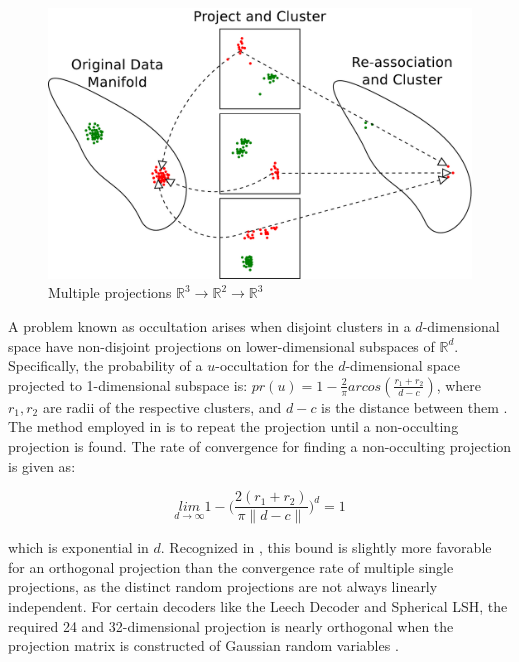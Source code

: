 \begin{figure}
    \centerline{\includegraphics[width=.8\textwidth]{figs/LowToHigh}}
    \caption{Multiple projections $\mathbb{R}^{3}\rightarrow \mathbb{R}^2 \rightarrow \mathbb{R}^3$}\label{lowtohigh}
\end{figure}

A problem known as occultation arises when disjoint clusters in a $d$-dimensional space have non-disjoint projections on
lower-dimensional subspaces of $\mathbb{R}^d$.  Specifically, the probability of a $u$-occultation for the
$d$-dimensional space projected to 1-dimensional subspace is: $pr(u) = 1-{\frac{2}{\pi}} arcos({\frac{r_1+r_2}{d-c}})$,
where $r_1, r_2$ are radii of the respective clusters, and $d-c$ is the distance between them \cite{Urruty2007}.  The
method employed in \cite{Urruty2007} is to repeat the projection until a non-occulting projection is found.  The rate of
convergence for finding a non-occulting projection is given as:

$$\underset {d\rightarrow \infty}{lim}1-\bigg({\frac{2(r_1+r_2)} {\pi \|d-c\|}}\bigg)^d = 1$$ \label{occultation}

\noindent
which is exponential in $d$.  Recognized in \cite{Urruty2007}, this bound is slightly more favorable for an orthogonal
projection than the convergence rate of multiple single projections, as the distinct random projections are not always
linearly independent.  For certain decoders like the Leech Decoder and Spherical LSH, the required 24 and 32-dimensional 
projection is nearly orthogonal when the projection matrix is constructed of Gaussian random variables \cite{vempala}.



